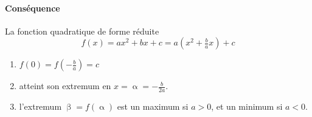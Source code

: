 \documentclass[main.tex]{subfiles}
\begin{document}
%	
%	
%	
%		
%		
%		
 
\paragraph{Conséquence} La fonction quadratique de forme réduite 
$$f(x)=ax^2+bx+c= a\left(x^2+\tfrac{b}{a}x\right) + c$$
\begin{enumerate}[label=\textbullet, leftmargin=*]
	\item $f(0)=f(-\tfrac{b}{a}) = c$
	\item atteint son extremum en   $x=\upalpha= -\frac{b}{2a}$. 
	\item l'extremum $\upbeta = f(\upalpha)$ est un maximum si $a>0$, et un minimum si $a<0$. 	
\end{enumerate}
 
\end{document}
